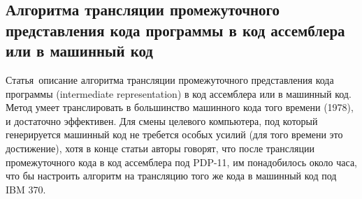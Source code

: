 \subsection{Алгоритма трансляции промежуточного представления кода программы в код ассемблера или в машинный код} \label{subsection_Glanville1978}
Статья\,\cite{Glanville1978} описание алгоритма трансляции промежуточного представления кода программы (intermediate representation) в код ассемблера или в машинный код. Метод умеет транслировать в большинство машинного кода того времени (1978), и достаточно эффективен. Для смены целевого компьютера, под который генерируется машинный код не требется особых усилий (для того времени это достижение), хотя в конце статьи авторы говорят, что после трансляции промежуточного кода в код ассемблера под PDP-11, им понадобилось около часа, что бы настроить алгоритм на трансляцию того же кода в машинный код под IBM 370.

